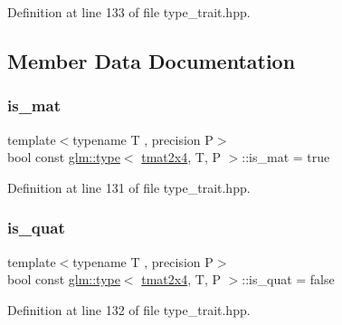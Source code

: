 Definition at line 133 of file type\+\_\+trait.\+hpp.



\subsection{Member Data Documentation}
\mbox{\label{structglm_1_1type_3_01tmat2x4_00_01_t_00_01_p_01_4_a957db726929de0402246a54984cdea2a}} 
\subsubsection{\texorpdfstring{is\_mat}{is\_mat}}
{\footnotesize\ttfamily template$<$typename T , precision P$>$ \\
bool const \mbox{\hyperlink{structglm_1_1type}{glm\+::type}}$<$ \mbox{\hyperlink{structglm_1_1tmat2x4}{tmat2x4}}, T, P $>$\+::is\+\_\+mat = true\hspace{0.3cm}{\ttfamily [static]}}



Definition at line 131 of file type\+\_\+trait.\+hpp.

\mbox{\label{structglm_1_1type_3_01tmat2x4_00_01_t_00_01_p_01_4_ab96ca1c8861fb97ab0bfa9a44d8a389c}} 
\subsubsection{\texorpdfstring{is\_quat}{is\_quat}}
{\footnotesize\ttfamily template$<$typename T , precision P$>$ \\
bool const \mbox{\hyperlink{structglm_1_1type}{glm\+::type}}$<$ \mbox{\hyperlink{structglm_1_1tmat2x4}{tmat2x4}}, T, P $>$\+::is\+\_\+quat = false\hspace{0.3cm}{\ttfamily [static]}}



Definition at line 132 of file type\+\_\+trait.\+hpp.

\mbox{\label{structglm_1_1type_3_01tmat2x4_00_01_t_00_01_p_01_4_a54a0dba0959b7ee6af5f60fc68125ca1}} 
